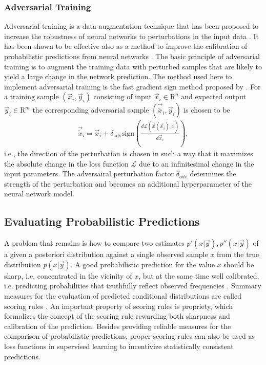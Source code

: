 \documentclass[journal abbreviation, manuscript]{copernicus}
\begin{document}
\subsubsection{Adversarial Training}

  Adversarial training is a data augmentation technique that has been proposed
  to increase the robustness of neural networks to perturbations in the input
  data \citep{goodfellow_2}. It has been shown to be effective also as a method
  to improve the calibration of probabilistic predictions from neural networks
  \citep{lakshminarayanan}. The basic principle of adversarial training is to
  augment the training data with perturbed samples that are likely to
  yield a large change in the network prediction. The method used here to
  implement adversarial training  is the fast gradient sign method
  proposed by \citet{goodfellow_2}. For a training sample $(\vec{x}_i, \vec{y}_i)$
  consisting of input $\vec{x}_i \in \mathrm{R}^{n}$ and expected output
  $\vec{y}_i \in \mathrm{R}^m$ the corresponding adversarial sample
  $(\vec{\tilde{x}}_i, \vec{y}_i)$ is chosen to be
    \begin{align}
      \vec{\tilde{x}}_i = \vec{x}_i + \delta_\text{adv} \text{sign} \left (
     \frac{d \mathcal{L}(\hat{\vec{x}}(\vec{x}_i), x)}{d\vec{x}_i}
      \right ),
    \end{align}
    i.e., the direction of the perturbation is chosen in such a way that
    it maximizes the absolute change in the loss function $\mathcal{L}$ due
    to an infinitesimal change in the input parameters. The adversairal
    perturbation factor $\delta_{adv}$ determines the strength of the perturbation
    and becomes an additional hyperparameter of the neural network model.

\subsection{Evaluating Probabilistic Predictions}

  A problem that remains is how to compare two estimates $p'(x | \vec{y}), p''(x
  | \vec{y})$ of a given a posteriori distribution against a single observed sample
  $x$ from the true distribution $p(x | \vec{y})$. A good
  probabilistic prediction for the value $x$ should be sharp, i.e. concentrated in
  the vicinity of $x$, but at the same time well calibrated, i.e. predicting
  probabilities that truthfully reflect observed frequencies \citep{gneiting_2}.
  Summary measures for the evaluation of predicted conditional distributions are
  called scoring rules \citep{gneiting}. An important property of scoring rules
  is propriety, which formalizes the concept of the scoring rule rewarding both
  sharpness and calibration of the prediction. Besides providing reliable
  measures for the comparison of probabilistic predictions, proper scoring rules
  can also be used as loss functions in supervised learning to incentivize
  statistically consistent predictions.
\end{document}
